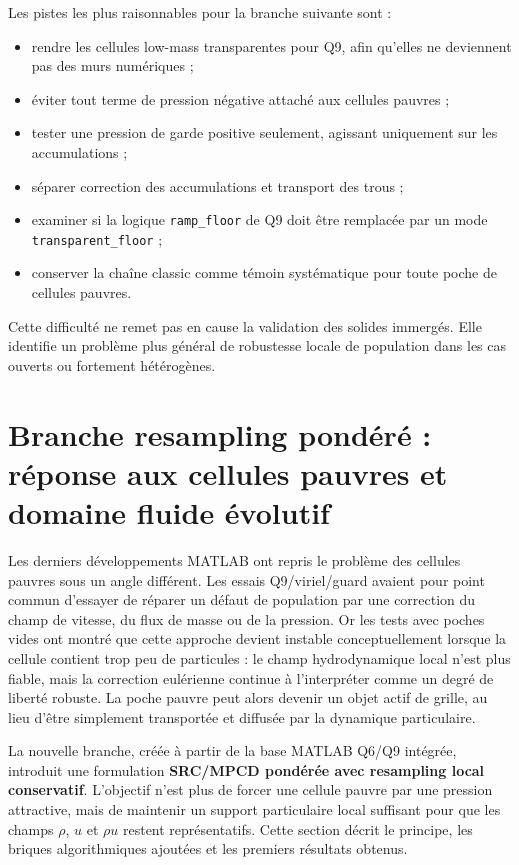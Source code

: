\documentclass[11pt,a4paper]{article}
\begin{document}
Les pistes les plus raisonnables pour la branche suivante sont :
\begin{itemize}
  \item rendre les cellules low-mass transparentes pour Q9, afin qu'elles ne deviennent pas des murs numériques ;
  \item éviter tout terme de pression négative attaché aux cellules pauvres ;
  \item tester une pression de garde positive seulement, agissant uniquement sur les accumulations ;
  \item séparer correction des accumulations et transport des trous ;
  \item examiner si la logique \texttt{ramp\_floor} de Q9 doit être remplacée par un mode \texttt{transparent\_floor} ;
  \item conserver la chaîne classic comme témoin systématique pour toute poche de cellules pauvres.
\end{itemize}

Cette difficulté ne remet pas en cause la validation des solides immergés. Elle identifie un problème plus général de robustesse locale de population dans les cas ouverts ou fortement hétérogènes.


\section{Branche resampling pondéré : réponse aux cellules pauvres et domaine fluide évolutif}

Les derniers développements MATLAB ont repris le problème des cellules pauvres sous un angle différent. Les essais Q9/viriel/guard avaient pour point commun d'essayer de réparer un défaut de population par une correction du champ de vitesse, du flux de masse ou de la pression. Or les tests avec poches vides ont montré que cette approche devient instable conceptuellement lorsque la cellule contient trop peu de particules : le champ hydrodynamique local n'est plus fiable, mais la correction eulérienne continue à l'interpréter comme un degré de liberté robuste. La poche pauvre peut alors devenir un objet actif de grille, au lieu d'être simplement transportée et diffusée par la dynamique particulaire.

La nouvelle branche, créée à partir de la base MATLAB Q6/Q9 intégrée, introduit une formulation \textbf{SRC/MPCD pondérée avec resampling local conservatif}. L'objectif n'est plus de forcer une cellule pauvre par une pression attractive, mais de maintenir un support particulaire local suffisant pour que les champs $\rho$, $u$ et $\rho u$ restent représentatifs. Cette section décrit le principe, les briques algorithmiques ajoutées et les premiers résultats obtenus.
\end{document}
